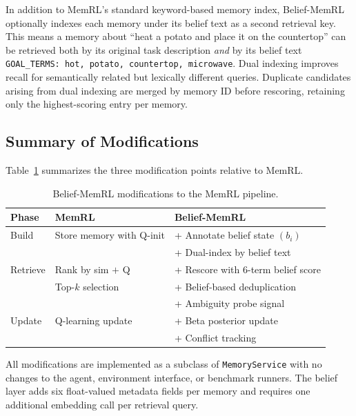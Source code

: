 In addition to MemRL's standard keyword-based memory index, Belief-MemRL optionally indexes each memory under its belief text as a second retrieval key. This means a memory about ``heat a potato and place it on the countertop'' can be retrieved both by its original task description \emph{and} by its belief text \texttt{GOAL\_TERMS: hot, potato, countertop, microwave}. Dual indexing improves recall for semantically related but lexically different queries. Duplicate candidates arising from dual indexing are merged by memory ID before rescoring, retaining only the highest-scoring entry per memory.

\subsection{Summary of Modifications}
\label{sec:summary}

Table~\ref{tab:modifications} summarizes the three modification points relative to MemRL.

\begin{table}[h]
\centering
\caption{Belief-MemRL modifications to the MemRL pipeline.}
\label{tab:modifications}
\begin{tabular}{lll}
\toprule
\textbf{Phase} & \textbf{MemRL} & \textbf{Belief-MemRL} \\
\midrule
Build  & Store memory with Q-init & + Annotate belief state $(b_i)$ \\
       &                          & + Dual-index by belief text \\
\midrule
Retrieve & Rank by sim $+$ Q & + Rescore with 6-term belief score \\
         & Top-$k$ selection  & + Belief-based deduplication \\
         &                    & + Ambiguity probe signal \\
\midrule
Update & Q-learning update & + Beta posterior update \\
       &                   & + Conflict tracking \\
\bottomrule
\end{tabular}
\end{table}

All modifications are implemented as a subclass of \texttt{MemoryService} with no changes to the agent, environment interface, or benchmark runners. The belief layer adds six float-valued metadata fields per memory and requires one additional embedding call per retrieval query.
